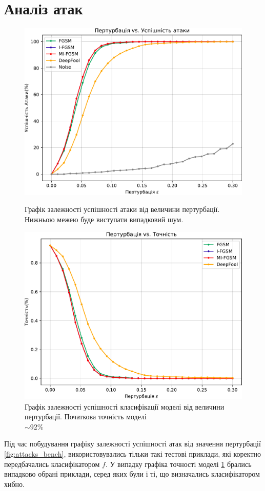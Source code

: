 \documentclass[a4paper,14pt]{extreport}
\begin{document}
	\section{Аналіз атак}
	
	\begin{figure}[!htb]
		\includegraphics[width=1\textwidth]{resources/attacks_bench_8_6.pdf}
		\caption{Графік залежності успішності атаки від величини пертурбації. Нижньою межею буде виступати випадковий шум. }
		\label{fig:attacks_bench}
		\endminipage\hfill
		\includegraphics[width=1\textwidth]{resources/defenses_bench_8_6.pdf}
		\caption{Графік залежності успішності класифікації моделі від величини пертурбації. Початкова точність моделі \\ $\sim 92\%$}
		\label{fig:defenses_bench}
		\endminipage
	\end{figure}
	Під час побудування графіку залежності успішності атак від значення пертурбації \ref{fig:attacks_bench}, використовувались тільки такі тестові приклади, які коректно передбачались класифікатором $f$. У випадку графіка точності моделі \ref{fig:defenses_bench} брались випадково обрані приклади, серед яких були і ті, що визначались класифікатором хибно.
	
\end{document}
